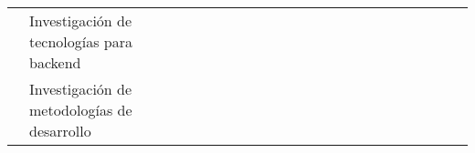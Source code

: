 \begin{landscape}
\begin{ThreePartTable}
\begin{longtable}{|p{}|p{5.5cm}|p{4cm}|l|l|l|l|l|l|l|l|l|l|l|l|l|l|l|l|l|l|l|}
            \cline{2-2}\cline{4-21}
                                                                                & Investigación de tecnologías para backend                           &                                                                &                                       & \cellcolor{green!25}                  &                                      &                                       &                      &                      &                      &                      &                      &                      &                      &                      &                      &                      &                      \\
            \cline{2-2}\cline{4-21}
                                                                                & Investigación de metodologías de desarrollo                         &                                                                &                                       & \cellcolor{green!25}                  &                                      &                                       &                      &                      &                      &                      &                      &                      &                      &                      &                      &                      &                      \\


\end{longtable}
\end{ThreePartTable}
\end{landscape}
